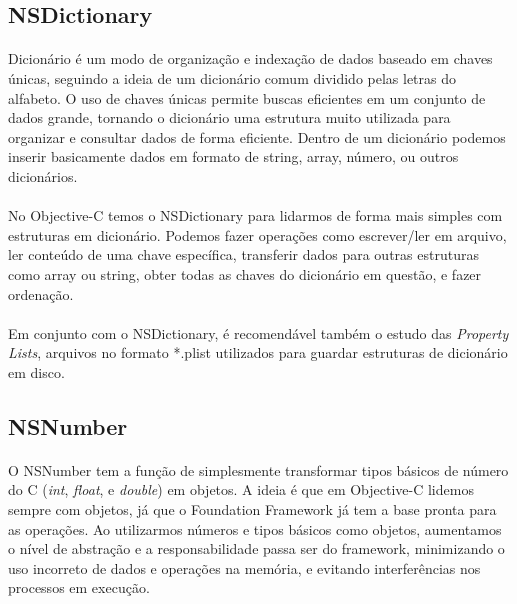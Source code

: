\documentclass[a4paper,12pt,brazil,doubleside]{book}
\begin{document}
\bigskip

\subsection{NSDictionary}

\paragraph{}Dicionário é um modo de organização e indexação de dados baseado em chaves únicas, seguindo a ideia de um dicionário comum dividido pelas letras do alfabeto. O uso de chaves únicas permite buscas eficientes em um conjunto de dados grande, tornando o dicionário uma estrutura muito utilizada para organizar e consultar dados de forma eficiente. Dentro de um dicionário podemos inserir basicamente dados em formato de string, array, número, ou outros dicionários.
\paragraph{}No Objective-C temos o NSDictionary para lidarmos de forma mais simples com estruturas em dicionário. Podemos fazer operações como escrever/ler em arquivo, ler conteúdo de uma chave específica, transferir dados para outras estruturas como array ou string, obter todas as chaves do dicionário em questão, e fazer ordenação.
\paragraph{}Em conjunto com o NSDictionary, é recomendável também o estudo das \emph{Property Lists}, arquivos no formato *.plist utilizados para guardar estruturas de dicionário em disco.

\bigskip

\subsection{NSNumber}

\paragraph{}O NSNumber tem a função de simplesmente transformar tipos básicos de número do C (\emph{int}, \emph{float}, e \emph{double}) em objetos. A ideia é que em Objective-C lidemos sempre com objetos, já que o Foundation Framework já tem a base pronta para as operações. Ao utilizarmos números e tipos básicos como objetos, aumentamos o nível de abstração e a responsabilidade passa ser do framework, minimizando o uso incorreto de dados e operações na memória, e evitando interferências nos processos em execução.
\end{document}
